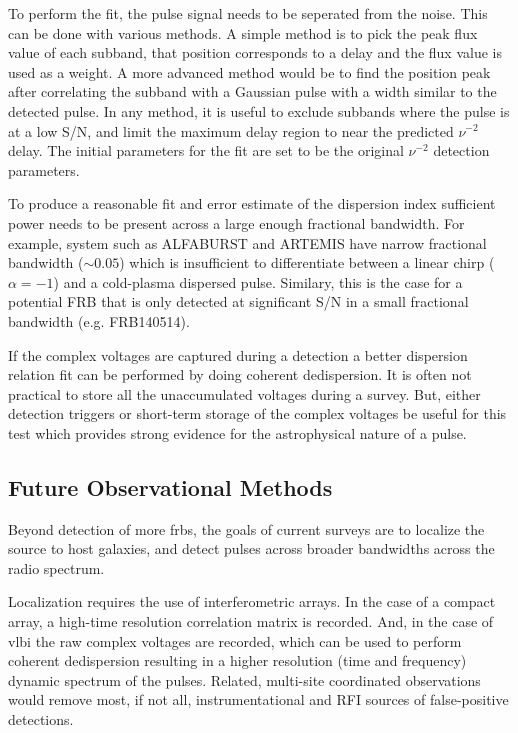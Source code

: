 \documentclass[a4paper,fleqn,usenatbib]{mnras}
\begin{document}
To perform the fit, the pulse signal needs to be seperated from the noise. This
can be done with various methods. A simple method is to pick the peak flux value
of each subband, that position corresponds to a delay and the flux value is used
as a weight. A more advanced method would be to find the position peak after
correlating the subband with a Gaussian pulse with a width similar to the
detected pulse. In any method, it is useful to exclude subbands where the pulse
is at a low S/N, and limit the maximum delay region to near the predicted
$\nu^{-2}$ delay. The initial parameters for the fit are set to be the original
$\nu^{-2}$ detection parameters.

To produce a reasonable fit and error estimate of the dispersion index
sufficient power needs to be present across a large enough fractional bandwidth.
For example, system such as ALFABURST and ARTEMIS have narrow fractional
bandwidth ($\sim 0.05$) which is insufficient to differentiate between a linear
chirp ($\alpha = -1$) and a cold-plasma dispersed pulse. Similary, this is the
case for a potential FRB that is only detected at significant S/N in a small
fractional bandwidth (e.g. FRB140514).

If the complex voltages are captured during a detection a better dispersion
relation fit can be performed by doing coherent dedispersion. It is often not
practical to store all the unaccumulated voltages during a survey. But, either
detection triggers or short-term storage of the complex voltages be useful for
this test which provides strong evidence for the astrophysical nature of a
pulse.

\subsection{Future Observational Methods}

Beyond detection of more \glspl{frb}, the goals of current surveys are to
localize the source to host galaxies, and detect pulses across broader
bandwidths across the radio spectrum.

Localization requires the use of interferometric arrays. In the case of a
compact array, a high-time resolution correlation matrix is recorded. And, in
the case of \gls{vlbi} the raw complex voltages are recorded, which can be used
to perform coherent dedispersion resulting in a higher resolution (time and
frequency) dynamic spectrum of the pulses.  Related, multi-site coordinated
observations would remove most, if not all, instrumentational and RFI sources of
false-positive detections.
\end{document}
